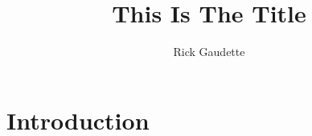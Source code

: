 \documentclass [11 pt, titlepage]{article}
\title {This Is The Title}
\author {Rick Gaudette}
\renewcommand{\baselinestretch}{2}
\begin{document}
\maketitle

%
%


\section{Introduction}
\label{sec:Introduction}
\vspace{-4ex}

% 
% 
\end{document}
